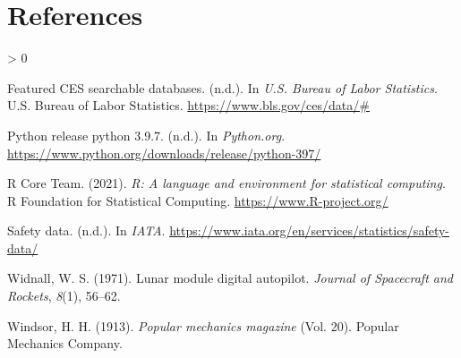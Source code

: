 \documentclass[
  english,
  man]{apa7}
\newlength{\cslhangindent}
\newenvironment{CSLReferences}[2] %
 {%
  \setlength{\parindent}{0pt}
  \ifodd #1 \everypar{\setlength{\hangindent}{\cslhangindent}}\ignorespaces\fi
  \ifnum #2 > 0
  \setlength{\parskip}{#2\baselineskip}
  \fi
 }%
 {}
\begin{document}
\newpage

\hypertarget{references}{%
\section{References}\label{references}}

\begingroup
\setlength{\parindent}{-0.5in}
\setlength{\leftskip}{0.5in}

\hypertarget{refs}{}
\begin{CSLReferences}{1}{0}
\leavevmode\hypertarget{ref-u.s}{}%
Featured CES searchable databases. (n.d.). In \emph{U.S. Bureau of Labor Statistics}. U.S. Bureau of Labor Statistics. \url{https://www.bls.gov/ces/data/\#}

\leavevmode\hypertarget{ref-python.org}{}%
Python release python 3.9.7. (n.d.). In \emph{Python.org}. \url{https://www.python.org/downloads/release/python-397/}

\leavevmode\hypertarget{ref-R-base}{}%
R Core Team. (2021). \emph{R: A language and environment for statistical computing}. R Foundation for Statistical Computing. \url{https://www.R-project.org/}

\leavevmode\hypertarget{ref-iata}{}%
Safety data. (n.d.). In \emph{IATA}. \url{https://www.iata.org/en/services/statistics/safety-data/}

\leavevmode\hypertarget{ref-widnall1971lunar}{}%
Widnall, W. S. (1971). Lunar module digital autopilot. \emph{Journal of Spacecraft and Rockets}, \emph{8}(1), 56--62.

\leavevmode\hypertarget{ref-windsor1913popular}{}%
Windsor, H. H. (1913). \emph{Popular mechanics magazine} (Vol. 20). Popular Mechanics Company.

\end{CSLReferences}

\endgroup
\end{document}
